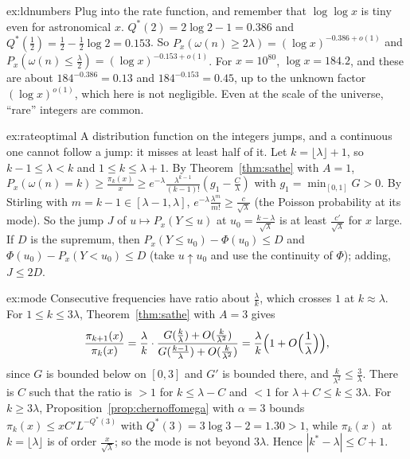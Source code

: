 \begin{solution}{ex:ldnumbers}
\idea Plug into the rate function, and remember that $\log\log x$ is tiny even for astronomical $x$.
\writeup $Q^*(2)=2\log2-1=0.386$ and $Q^*(\frac12)=\frac12-\frac12\log2=0.153$. So $P_x(\omega(n)\ge2\lambda)=(\log x)^{-0.386+o(1)}$ and $P_x(\omega(n)\le\frac\lambda2)=(\log x)^{-0.153+o(1)}$. For $x=10^{80}$, $\log x=184.2$, and these are about $184^{-0.386}=0.13$ and $184^{-0.153}=0.45$, up to the unknown factor $(\log x)^{o(1)}$, which here is not negligible. Even at the scale of the universe, ``rare'' integers are common.
\end{solution}

\begin{solution}{ex:rateoptimal}
\idea A distribution function on the integers jumps, and a continuous one cannot follow a jump: it misses at least half of it.
\writeup Let $k=\lfloor\lambda\rfloor+1$, so $k-1\le\lambda<k$ and $1\le k\le\lambda+1$. By Theorem~\ref{thm:sathe} with $A=1$, $P_x(\omega(n)=k)\ge\frac{\pi_k(x)}x\ge e^{-\lambda}\frac{\lambda^{k-1}}{(k-1)!}(g_1-\frac{C}{\lambda})$ with $g_1=\min_{[0,1]}G>0$. By Stirling with $m=k-1\in[\lambda-1,\lambda]$, $e^{-\lambda}\frac{\lambda^m}{m!}\ge\frac{c}{\sqrt\lambda}$ (the Poisson probability at its mode). So the jump $J$ of $u\mapsto P_x(Y\le u)$ at $u_0=\frac{k-\lambda}{\sqrt\lambda}$ is at least $\frac{c'}{\sqrt\lambda}$ for $x$ large. If $D$ is the supremum, then $P_x(Y\le u_0)-\Phi(u_0)\le D$ and $\Phi(u_0)-P_x(Y<u_0)\le D$ (take $u\uparrow u_0$ and use the continuity of $\Phi$); adding, $J\le2D$.
\end{solution}

\begin{solution}{ex:mode}
\idea Consecutive frequencies have ratio about $\frac\lambda k$, which crosses $1$ at $k\approx\lambda$.
\writeup For $1\le k\le3\lambda$, Theorem~\ref{thm:sathe} with $A=3$ gives
\[
\frac{\pi_{k+1}(x)}{\pi_k(x)}=\frac\lambda k\cdot\frac{G(\frac k\lambda)+O(\frac k{\lambda^2})}{G(\frac{k-1}\lambda)+O(\frac k{\lambda^2})}=\frac\lambda k\Bigl(1+O\Bigl(\frac1\lambda\Bigr)\Bigr),
\]
since $G$ is bounded below on $[0,3]$ and $G'$ is bounded there, and $\frac k{\lambda^2}\le\frac3\lambda$. There is $C$ such that the ratio is $>1$ for $k\le\lambda-C$ and $<1$ for $\lambda+C\le k\le3\lambda$. For $k\ge3\lambda$, Proposition~\ref{prop:chernoffomega} with $\alpha=3$ bounds $\pi_k(x)\le xC'L^{-Q^*(3)}$ with $Q^*(3)=3\log3-2=1.30>1$, while $\pi_{k}(x)$ at $k=\lfloor\lambda\rfloor$ is of order $\frac x{\sqrt\lambda}$; so the mode is not beyond $3\lambda$. Hence $|k^*-\lambda|\le C+1$.
\end{solution}

